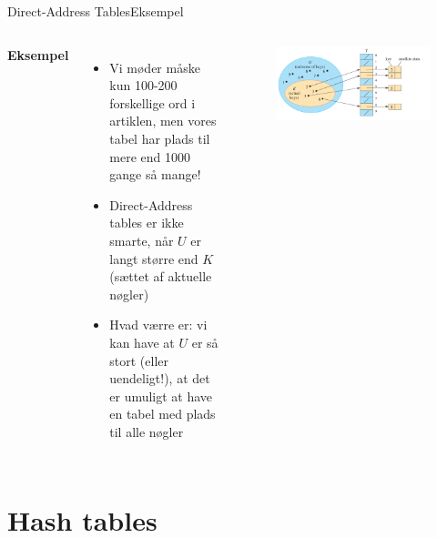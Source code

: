 \documentclass[aspectratio=1610]{beamer}
\begin{document}
\begin{frame}{Direct-Address Tables}{Eksempel}

    \begin{columns}
        \small
        \textbf{Eksempel}
        \begin{itemize}[<+(1)->]
            \item Vi møder måske kun 100-200 forskellige ord i artiklen, men
                vores tabel har plads til mere end 1000 gange så mange!
            \item Direct-Address tables er ikke smarte, når $U$ er langt større
                end $K$ (sættet af aktuelle nøgler)
            \item Hvad værre er: vi kan have at $U$ er så stort (eller
                uendeligt!), at det er umuligt at have en tabel med plads til
                alle nøgler
        \end{itemize}
    
        \begin{figure}[h]
            \centering
            \includegraphics[width=\textwidth]{direct-address-table}
        \end{figure}
    \end{columns}
\end{frame}


\section{Hash tables}
\end{document}
